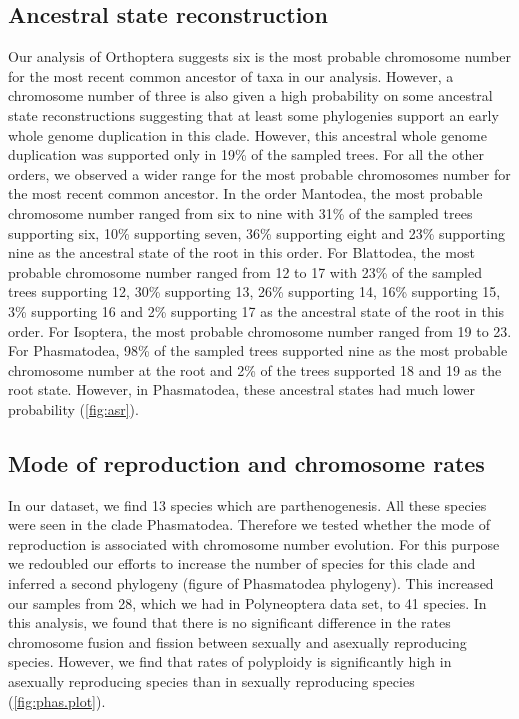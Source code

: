 \subsection{Ancestral state reconstruction}
Our analysis of Orthoptera suggests six is the most probable chromosome number for the most recent common ancestor of taxa in our analysis. 
However, a chromosome number of three is also given a high probability on some ancestral state reconstructions suggesting that at least some phylogenies support an early whole genome duplication in this clade.
However, this ancestral whole genome duplication was supported only in 19\% of the sampled trees.
For all the other orders, we observed a wider range for the most probable chromosomes number for the most recent common ancestor.
In the order Mantodea, the most probable chromosome number ranged from six to nine with 31\% of the sampled trees supporting six, 10\% supporting seven, 36\% supporting eight and 23\% supporting nine as the ancestral state of the root in this order. 
For Blattodea, the most probable chromosome number ranged from 12 to 17 with 23\% of the sampled trees supporting 12, 30\% supporting 13, 26\% supporting 14, 16\% supporting 15, 3\% supporting 16 and 2\% supporting 17 as the ancestral state of the root in this order.
For Isoptera, the most probable chromosome number ranged from 19 to 23.
For Phasmatodea, 98\% of the sampled trees supported nine as the most probable chromosome number at the root and 2\% of the trees supported 18 and 19 as the root state. 
However, in Phasmatodea, these ancestral states had much lower probability (\cref{fig:asr}).

\subsection{Mode of reproduction and chromosome rates}
In our dataset, we find 13 species which are parthenogenesis. 
All these species were seen in the clade Phasmatodea.
Therefore we tested whether the mode of reproduction is associated with chromosome number evolution. 
For this purpose we redoubled our efforts to increase the number of species for this clade and inferred a second phylogeny (figure of Phasmatodea phylogeny).
This increased our samples from 28, which we had in Polyneoptera data set, to 41 species. 
In this analysis, we found that there is no significant difference in the rates chromosome fusion and fission between sexually and asexually reproducing species.
However, we find that rates of polyploidy is significantly high in asexually reproducing species than in sexually reproducing species (\cref{fig:phas.plot}).